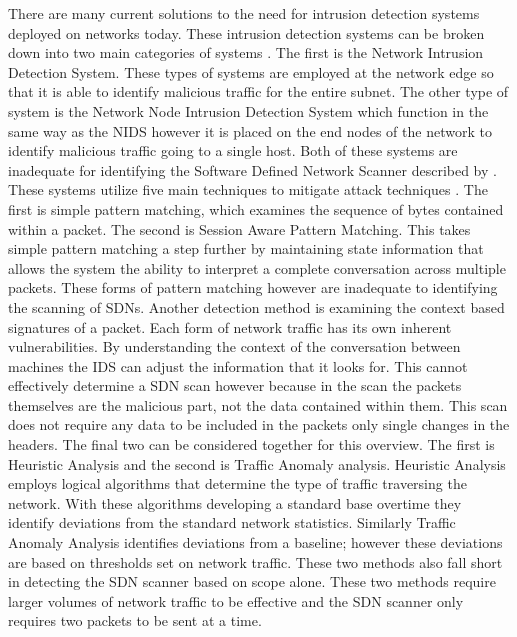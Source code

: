 \documentclass[twocolumn]{article}
\begin{document}
	There are many current solutions to the need for intrusion detection systems deployed on networks today. These intrusion detection systems can be broken down into two main categories of systems \cite{SANS}. The first is the Network Intrusion Detection System. These types of systems are employed at the network edge so that it is able to identify malicious traffic for the entire subnet. The other type of system is the Network Node Intrusion Detection System which function in the same way as the NIDS however it is placed on the end nodes of the network to identify malicious traffic going to a single host. Both of these systems are inadequate for identifying the Software Defined Network Scanner described by \cite{Gu13}. These systems utilize five main techniques to mitigate attack techniques \cite{CISCO}. The first is simple pattern matching, which examines the sequence of bytes contained within a packet. The second is Session Aware Pattern Matching. This takes simple pattern matching a step further by maintaining state information that allows the system the ability to interpret a complete conversation across multiple packets. These forms of pattern matching however are inadequate to identifying the scanning of SDNs. Another detection method is examining the context based signatures of a packet. Each form of network traffic has its own inherent vulnerabilities. By understanding the context of the conversation between machines the IDS can adjust the information that it looks for. This cannot effectively determine a SDN scan however because in the scan the packets themselves are the malicious part, not the data contained within them. This scan does not require any data to be included in the packets only single changes in the headers. The final two can be considered together for this overview. The first is Heuristic Analysis and the second is Traffic Anomaly analysis. Heuristic Analysis employs logical algorithms that determine the type of traffic traversing the network. With these algorithms developing a standard base overtime they identify deviations from the standard network statistics. Similarly Traffic Anomaly Analysis identifies deviations from a baseline; however these deviations are based on thresholds set on network traffic. These two methods also fall short in detecting the SDN scanner based on scope alone. These two methods require larger volumes of network traffic to be effective and the SDN scanner only requires two packets to be sent at a time. 
\end{document}
